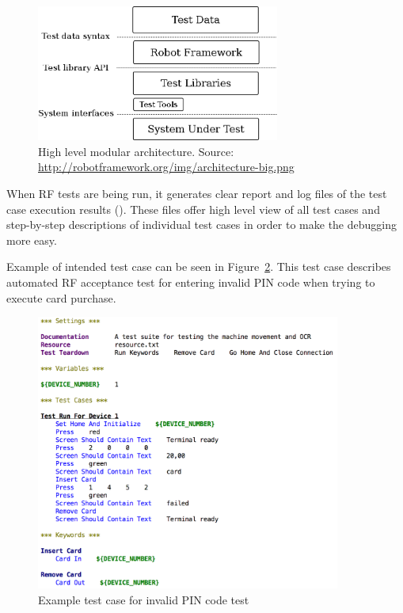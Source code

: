 \begin{figure}[ht]
  \begin{center}
    \includegraphics[width=8cm]{images/architecture-big.png}
    \caption{High level modular architecture. Source: \url{http://robotframework.org/img/architecture-big.png}}
    \label{fig:modular_architecture}
  \end{center}
\end{figure}

When RF tests are being run, it generates clear report and log files of the test case execution results (\emph{\citep{Rfuserguide}}). These files offer high level view of all test cases and step-by-step descriptions of individual test cases in order to make the debugging more easy.

Example of intended test case can be seen in Figure~\ref{fig:invalid_pin_test}. This test case describes automated RF acceptance test for entering invalid PIN code when trying to execute card purchase.

\begin{figure}[ht]
  \begin{center}
    \includegraphics[width=10cm]{images/example_test.png}
    \caption{Example test case for invalid PIN code test}
    \label{fig:invalid_pin_test}
  \end{center}
\end{figure}

